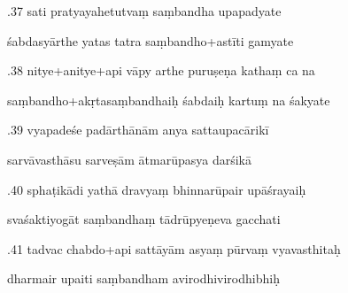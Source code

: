 \documentclass[article,12pt,a4paper]{memoir}%
\newcounter{parCount}
\begin{document}
	  
	  \pstart {}.37 sati pratyayahetutvaṃ saṃbandha upapadyate 
	{}
	\pend%
      

	  
	  \pstart \leavevmode%
	śabdasyārthe yatas tatra saṃbandho+astīti gamyate 
	{}
	\pend%
      

	  
	  \pstart {}.38 nitye+anitye+api vāpy arthe puruṣeṇa kathaṃ ca na 
	{}
	\pend%
      

	  
	  \pstart \leavevmode%
	saṃbandho+akṛtasaṃbandhaiḥ śabdaiḥ kartuṃ na śakyate 
	{}
	\pend%
      

	  
	  \pstart {}.39 vyapadeśe padārthānām anya sattaupacārikī 
	{}
	\pend%
      

	  
	  \pstart \leavevmode%
	sarvāvasthāsu sarveṣām ātmarūpasya darśikā 
	{}
	\pend%
      

	  
	  \pstart {}.40 sphaṭikādi yathā dravyaṃ bhinnarūpair upāśrayaiḥ 
	{}
	\pend%
      

	  
	  \pstart \leavevmode%
	svaśaktiyogāt saṃbandhaṃ tādrūpyeṇeva gacchati 
	{}
	\pend%
      

	  
	  \pstart {}.41 tadvac chabdo+api sattāyām asyaṃ pūrvaṃ vyavasthitaḥ 
	{}
	\pend%
      

	  
	  \pstart \leavevmode%
	dharmair upaiti saṃbandham avirodhivirodhibhiḥ 
	{}
	\pend%
      
\end{document}
